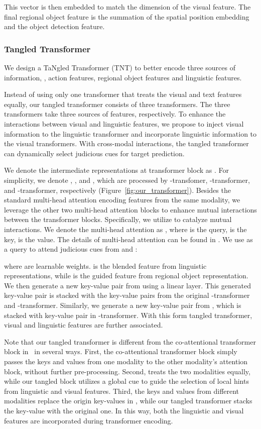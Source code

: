 \documentclass[10pt,twocolumn,letterpaper]{article}
\begin{document}
This vector is then embedded to match the dimension of the visual feature. The final regional object feature is the summation of the spatial position embedding and the object detection feature.


\subsubsection{Tangled Transformer}
We design a TaNgled Transformer (TNT) to better encode three sources of information, \ie, action features, regional object features and linguistic features.

Instead of using only one transformer that treats the visual and text features equally, our tangled transformer consists of three transformers. The three transformers take three sources of features, respectively. To enhance the interactions between visual and linguistic features, we propose to inject visual information to the linguistic transformer and incorporate linguistic information to the visual transformers. With cross-modal interactions, the tangled transformer can dynamically select judicious cues for target prediction.

We denote the intermediate representations at transformer block  as  . For simplicity, we denote , , and
, which are processed by -transfomer, -transformer, and -transformer, respectively (Figure~\ref{fig:our_transformer}).
Besides the standard multi-head attention encoding features from the same modality, we leverage the other two multi-head attention blocks to enhance  mutual interactions between the transformer blocks.
Specifically, we utilize  to catalyze mutual interactions. We denote the multi-head attention as , where  is the query,  is the key,  is the value. The details of multi-head attention can be found in \cite{vaswani2017attention}.
We use  as a query to attend judicious cues from  and :

where  are learnable weights.  is the blended feature from linguistic representations, while  is the guided feature from regional object representation. We then generate a new key-value pair from  using a linear layer. This generated key-value pair is stacked with the key-value pairs from the original -transformer and -transformer. Similarly, we generate a new key-value pair from , which is stacked with key-value pair in -transformer.
With this form tangled transformer, visual and linguistic features are further associated.

Note that our tangled transformer is different from the co-attentional transformer block in~\cite{lu2019vilbert} in several ways.
First, the co-attentional transformer block simply passes the keys and values
from one modality to the other modality's attention block, without further pre-processing. Second, \cite{lu2019vilbert} treats the two modalities equally, while our tangled block utilizes a global cue to guide the selection of local hints from linguistic and visual features. Third, the keys and values from different modalities replace the origin key-values in \cite{lu2019vilbert}, while our tangled transformer stacks the key-value with the original one. In this way, both the linguistic and visual features are incorporated during transformer encoding.
\end{document}
